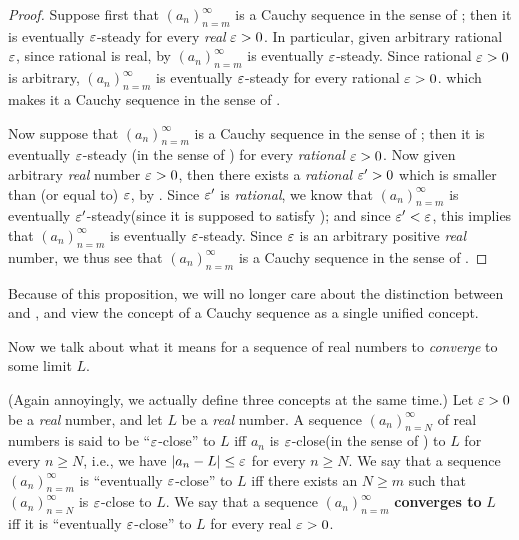\begin{proof}
Suppose first that \((a_n)_{n = m}^{\infty}\) is a Cauchy sequence in the sense of ;
then it is eventually \(\varepsilon\)-steady for every \emph{real} \(\varepsilon > 0\).
In particular, given arbitrary rational \(\varepsilon\), since rational is real, by  \((a_n)_{n = m}^{\infty}\) is eventually \(\varepsilon\)-steady.
Since rational \(\varepsilon > 0\) is arbitrary, \((a_n)_{n = m}^{\infty}\) is eventually \(\varepsilon\)-steady for every rational \(\varepsilon > 0\).
which makes it a Cauchy sequence in the sense of .

Now suppose that \((a_n)_{n = m}^{\infty}\) is a Cauchy sequence in the sense of ;
then it is eventually \(\varepsilon\)-steady (in the sense of ) for every \emph{rational} \(\varepsilon > 0\).
Now given arbitrary \emph{real} number \(\varepsilon > 0\), then there exists a \emph{rational} \(\varepsilon' > 0\) which is smaller than (or equal to) \(\varepsilon\), by .
Since \(\varepsilon'\) is \emph{rational}, we know that \((a_n)_{n = m}^{\infty}\) is eventually \(\varepsilon'\)-steady(since it is supposed to satisfy );
and since \(\varepsilon' < \varepsilon\), this implies that \((a_n)_{n = m}^{\infty}\) is eventually \(\varepsilon\)-steady.
Since \(\varepsilon\) is an arbitrary positive \emph{real} number, we thus see that \((a_n)_{n = m}^{\infty}\) is a Cauchy sequence in the sense of .
\end{proof}

\begin{note}
Because of this proposition, we will no longer care about the distinction between  and , and view the concept of a Cauchy sequence as a single unified concept.
\end{note}

Now we talk about what it means for a sequence of real numbers to \emph{converge} to some limit \(L\).

\begin{definition}  \label{def 6.1.5}
(Again annoyingly, we actually define three concepts at the same time.)
Let \(\varepsilon > 0\) be a \emph{real} number, and let \(L\) be a \emph{real} number.
 A sequence \((a_n)_{n = N}^{\infty}\) of real numbers is said to be ``\(\varepsilon\)-close'' to \(L\) iff \(a_n\) is \(\varepsilon\)-close(in the sense of ) to \(L\) for every \(n \ge N\),
i.e., we have \(\lvert a_n - L\rvert \le \varepsilon\) for every \(n \ge N\).
 We say that a sequence \((a_n)_{n = m}^{\infty}\) is ``eventually \(\varepsilon\)-close'' to \(L\) iff there exists an \(N \ge m\) such that \((a_n)_{n = N}^{\infty}\) is \(\varepsilon\)-close to \(L\).
 We say that a sequence \((a_n)_{n = m}^{\infty}\) \textbf{converges to} \(L\) iff it is ``eventually \(\varepsilon\)-close'' to \(L\) for every real \(\varepsilon > 0\).
\end{definition}


